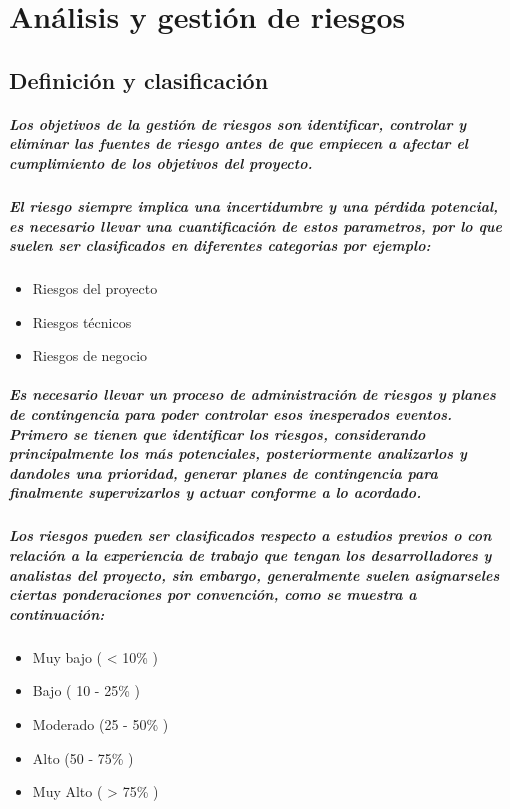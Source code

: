 \chapter{Análisis y gestión de riesgos}
  \section{Definición y clasificación}
    \paragraph{Los objetivos de la gestión de riesgos son identificar, controlar y eliminar las fuentes de riesgo antes de que empiecen a afectar el cumplimiento de los objetivos del proyecto.}
    \paragraph{El riesgo siempre implica una incertidumbre y una pérdida potencial, es necesario llevar una cuantificación de estos parametros, por lo que suelen ser clasificados en diferentes categorias por ejemplo:}
    \begin{itemize}
      \item Riesgos del proyecto
      \item Riesgos técnicos
      \item Riesgos de negocio
    \end{itemize}
    \paragraph{Es necesario llevar un proceso de administración de riesgos y planes de contingencia para poder controlar esos inesperados eventos. Primero se tienen que identificar los riesgos, considerando principalmente los más potenciales, posteriormente analizarlos y dandoles una prioridad, generar planes de contingencia para finalmente supervizarlos y actuar conforme a lo acordado.}
    \paragraph{Los riesgos pueden ser clasificados respecto a estudios previos o con relación a la experiencia de trabajo que tengan los desarrolladores y analistas del proyecto, sin embargo, generalmente suelen asignarseles ciertas ponderaciones por convención, como se muestra a continuación:}
    \begin{itemize}
      \item Muy bajo ( < 10\% )
      \item Bajo ( 10 - 25\% )
      \item Moderado (25 - 50\% )
      \item Alto (50 - 75\% )
      \item Muy Alto ( > 75\% )
    \end{itemize}
